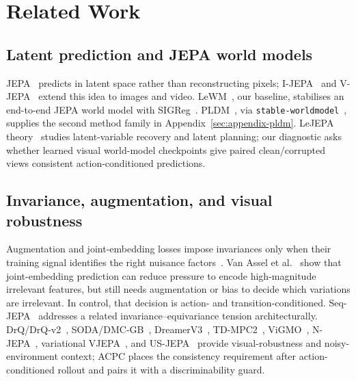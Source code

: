 \documentclass[10pt]{article}
\newcommand{\code}[1]{\texttt{\small #1}}
\begin{document}
\section{Related Work}\label{sec:related}

\subsection{Latent prediction and JEPA world models}
JEPA~\cite{lecun2022path} predicts in latent space rather than reconstructing pixels; I-JEPA~\cite{assran2023ijepa} and V-JEPA~\cite{bardes2024vjepa,assran2025vjepa2} extend this idea to images and video. LeWM~\cite{maes2026lewm}, our baseline, stabilises an end-to-end JEPA world model with SIGReg~\cite{eppspulley1983}. PLDM~\cite{sobal2022jointembeddingpredictivearchitectures,sobal2025stresstesting}, via \code{stable-worldmodel}~\cite{maes2026stableworldmodel}, supplies the second method family in Appendix~\ref{sec:appendix-pldm}. LeJEPA theory~\cite{klindt2026lejepaworldmodel} studies latent-variable recovery and latent planning; our diagnostic asks whether learned visual world-model checkpoints give paired clean/corrupted views consistent action-conditioned predictions.

\subsection{Invariance, augmentation, and visual robustness}
Augmentation and joint-embedding losses impose invariances only when their training signal identifies the right nuisance factors~\cite{wang2020alignuniform,tamkin2023featuredropout,zhang2022rethinkaug}. Van Assel et al.~\cite{vanassel2025jointembeddingreconstruction} show that joint-embedding prediction can reduce pressure to encode high-magnitude irrelevant features, but still needs augmentation or bias to decide which variations are irrelevant. In control, that decision is action- and transition-conditioned. Seq-JEPA~\cite{ghaemi2025seqjepa} addresses a related invariance--equivariance tension architecturally. DrQ/DrQ-v2~\cite{kostrikov2020drq,yarats2022drqv2}, SODA/DMC-GB~\cite{hansen2021soda}, DreamerV3~\cite{hafner2025dreamerv3}, TD-MPC2~\cite{hansen2024tdmpc2}, ViGMO~\cite{vigmo}, N-JEPA~\cite{njepa2025}, variational VJEPA~\cite{huang2026vjepa}, and US-JEPA~\cite{usjepa2025} provide visual-robustness and noisy-environment context; ACPC places the consistency requirement after action-conditioned rollout and pairs it with a discriminability guard.
\end{document}
